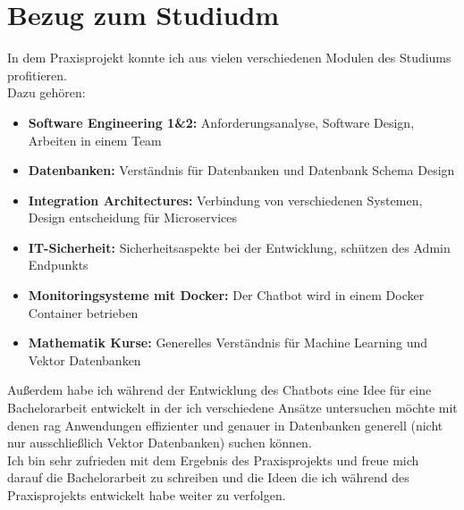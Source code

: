 \chapter{Bezug zum Studiudm}\label{ch:bezug_studium}
In dem Praxisprojekt konnte ich aus vielen verschiedenen Modulen des Studiums profitieren.\\
Dazu gehören:
\begin{itemize}
    \item \textbf{Software Engineering 1\&2:} Anforderungsanalyse, Software Design, Arbeiten in einem Team
    \item \textbf{Datenbanken:} Verständnis für Datenbanken und Datenbank Schema Design
    \item \textbf{Integration Architectures:} Verbindung von verschiedenen Systemen, Design entscheidung für Microservices
    \item \textbf{IT-Sicherheit:} Sicherheitsaspekte bei der Entwicklung, schützen des Admin Endpunkts
    \item \textbf{Monitoringsysteme mit Docker:} Der Chatbot wird in einem Docker Container betrieben
    \item \textbf{Mathematik Kurse:} Generelles Verständnis für Machine Learning und Vektor Datenbanken
\end{itemize}

Außerdem habe ich während der Entwicklung des Chatbots eine Idee für eine Bachelorarbeit entwickelt in der ich
verschiedene Ansätze untersuchen möchte mit denen \gls{rag} Anwendungen effizienter und genauer in Datenbanken generell (nicht nur ausschließlich Vektor Datenbanken) suchen können.\\

Ich bin sehr zufrieden mit dem Ergebnis des Praxisprojekts und freue mich darauf die Bachelorarbeit zu schreiben und die Ideen die ich während des Praxisprojekts entwickelt habe weiter zu verfolgen.
